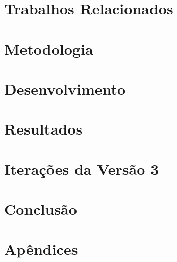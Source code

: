 \documentclass[12pt,openright,twoside,a4paper]{abntex2}
\begin{document}
\chapter{Trabalhos Relacionados}
\lipsum[4]

\chapter{Metodologia}


\chapter{Desenvolvimento}


\chapter{Resultados}


\chapter{Iterações da Versão 3}


\chapter{Conclusão}






\appendix
\chapter{Apêndices}
\lipsum[9]
\end{document}
